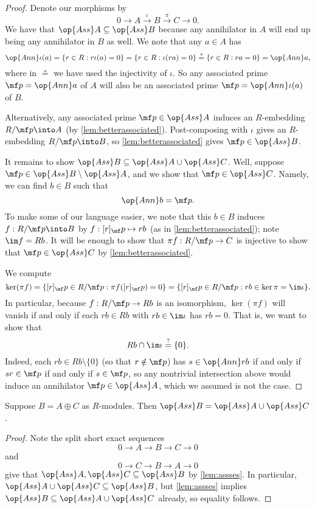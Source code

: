 \begin{proof}
	Denote our morphisms by
	\[0\to A\stackrel\iota\to B\stackrel\pi\to C\to 0.\]
	We have that $\op{Ass}A\subseteq\op{Ass}B$ because any annihilator in $A$ will end up being any annihilator in $B$ as well. We note that any $a\in A$ has
	\[\op{Ann}\iota(a)=\{r\in R:r\iota(a)=0\}=\{r\in R:\iota(ra)=0\}\stackrel*=\{r\in R:ra=0\}=\op{Ann}a,\]
	where in $\stackrel*=$ we have used the injectivity of $\iota$. So any associated prime $\mf p=\op{Ann}a$ of $A$ will also be an associated prime $\mf p=\op{Ann}\iota(a)$ of $B$.
	\begin{remark}[Nir]
		Alternatively, any associated prime $\mf p\in\op{Ass}A$ induces an $R$-embedding $R/\mf p\into A$ (by \autoref{lem:betterassociated}). Post-composing with $\iota$ gives an $R$-embedding $R/\mf p\into B$, so \autoref{lem:betterassociated} gives $\mf p\in\op{Ass}B$.
	\end{remark}

	It remains to show $\op{Ass}B\subseteq\op{Ass}A\cup\op{Ass}C$. Well, suppose $\mf p\in\op{Ass}B\setminus\op{Ass}A$, and we show that $\mf p\in\op{Ass}C$. Namely, we can find $b\in B$ such that
	\[\op{Ann}b=\mf p.\]
	To make some of our language easier, we note that this $b\in B$ induces $f:R/\mf p\into B$ by $f:[r]_\mf p\mapsto rb$ (as in \autoref{lem:betterassociated}); note $\im f=Rb$. It will be enough to show that $\pi f:R/\mf p\to C$ is injective to show that $\mf p\in\op{Ass}C$ by \autoref{lem:betterassociated}.
	
	We compute
	\[\ker(\pi f)=\{[r]_\mf p\in R/\mf p:\pi f([r]_\mf p)=0\}=\{[r]_\mf p\in R/\mf p:rb\in\ker\pi=\im\iota\}.\]
	In particular, because $f:R/\mf p\to Rb$ is an isomorphism, $\ker(\pi f)$ will vanish if and only if each $rb\in Rb$ with $rb\in\im\iota$ has $rb=0$. That is, we want to show that
	\[Rb\cap\im\iota\stackrel?=\{0\}.\]
	Indeed, each $rb\in Rb\setminus\{0\}$ (so that $r\notin\mf p$) has $s\in\op{Ann}rb$ if and only if $sr\in\mf p$ if and only if $s\in\mf p$, so any nontrivial intersection above would induce an annihilator $\mf p\in\op{Ass}A$, which we assumed is not the case.
\end{proof}
\begin{corollary} \label{cor:dirsumass}
	Suppose $B=A\oplus C$ as $R$-modules. Then $\op{Ass}B=\op{Ass}A\cup\op{Ass}C$.
\end{corollary}
\begin{proof}
	Note the split short exact sequences
	\[0\to A\to B\to C\to 0\]
	and
	\[0\to C\to B\to A\to 0\]
	give that $\op{Ass}A,\op{Ass}C\subseteq\op{Ass}B$ by \autoref{lem:assses}. In particular, $\op{Ass}A\cup\op{Ass}C\subseteq\op{Ass}B$, but \autoref{lem:assses} implies $\op{Ass}B\subseteq\op{Ass}A\cup\op{Ass}C$ already, so equality follows.
\end{proof}
